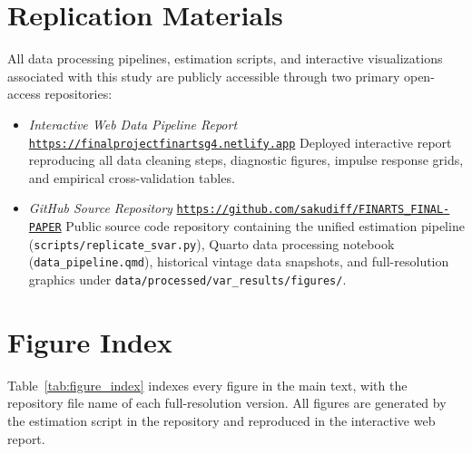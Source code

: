 \section{Replication Materials}

All data processing pipelines, estimation scripts, and interactive visualizations associated with this study are publicly accessible through two primary open-access repositories:

\begin{itemize}
    \item \textit{Interactive Web Data Pipeline Report}
\newline \href{https://finalprojectfinartsg4.netlify.app}{\texttt{https://finalprojectfinartsg4.netlify.app}}
\newline Deployed interactive report reproducing all data cleaning steps, diagnostic figures, impulse response grids, and empirical cross-validation tables.

    \item \textit{GitHub Source Repository}
\newline \href{https://github.com/sakudiff/FINARTS_FINAL-PAPER}{\texttt{https://github.com/sakudiff/FINARTS\_FINAL-PAPER}}
\newline Public source code repository containing the unified estimation pipeline (\texttt{scripts/replicate\_svar.py}), Quarto data processing notebook (\texttt{data\_pipeline.qmd}), historical vintage data snapshots, and full-resolution graphics under \texttt{data/processed/var\_results/figures/}.
\end{itemize}

\section{Figure Index}

Table~\ref{tab:figure_index} indexes every figure in the main text, with the repository file name of each full-resolution version. All figures are generated by the estimation script in the repository and reproduced in the interactive web report.

